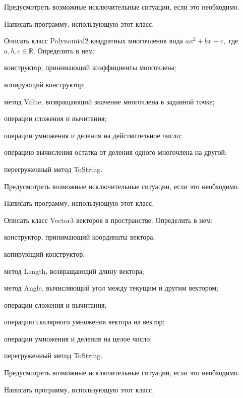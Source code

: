 Предусмотреть возможные исключительные ситуации, если это необходимо.

Написать программу, использующую этот класс.

\task Описать класс Polynomial2 квадратных многочленов вида
$ax^2+bx+c,$ где $a,b,c \in \mathbb{R}$. Определить в нем:
\begin{itemize*}
\item конструктор, принимающий коэффициенты многочлена;
\item копирующий конструктор;
\item метод Value, возвращающий значение многочлена в заданной точке;
\item операции сложения и вычитания;
\item операции умножения и деления на действительное число;
\item операцию вычисления остатка от деления одного многочлена на
  другой;
\item перегруженный метод ToString.
\end{itemize*}

Предусмотреть возможные исключительные ситуации, если это необходимо.

Написать программу, использующую этот класс.

\task Описать класс Vector3 векторов в пространстве. Определить в нем:
\begin{itemize*}
\item конструктор, принимающий координаты вектора;
\item копирующий конструктор;
\item метод Length, возвращающий длину вектора;
\item метод Angle, вычисляющий угол между текущим и другим вектором;
\item операции сложения и вычитания;
\item операцию скалярного умножения вектора на вектор;
\item операции умножения и деления на целое число;
\item перегруженный метод ToString.
\end{itemize*}

Предусмотреть возможные исключительные ситуации, если это необходимо.

Написать программу, использующую этот класс.

